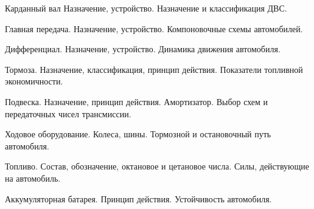 \documentclass[
	14pt,
	a4paper,
	]
	{scrartcl}
\begin{document}
\vfill
\z Карданный вал Назначение, устройство.
 \vfill
\z Назначение и классификация ДВС.
 \vfill

\vfill

\newpage


\shapk
{}
\setcounter{zad}{0}

\vfill
\z Главная передача. Назначение, устройство.
 \vfill
\z Компоновочные схемы автомобилей.
 \vfill

\vfill

\newpage


\shapk
{}
\setcounter{zad}{0}

\vfill
\z Дифференциал. Назначение, устройство.
 \vfill
\z Динамика движения автомобиля.
 \vfill

\vfill

\newpage


\shapk
{}
\setcounter{zad}{0}

\vfill
\z Тормоза. Назначение, классификация, принцип действия.
 \vfill
\z Показатели топливной экономичности.
 \vfill

\vfill

\newpage


\shapk
{}
\setcounter{zad}{0}

\vfill
\z Подвеска. Назначение, принцип действия. Амортизатор.
 \vfill
\z Выбор схем  и передаточных чисел трансмиссии.
 \vfill

\vfill

\newpage


\shapk
{}
\setcounter{zad}{0}

\vfill
\z Ходовое оборудование. Колеса, шины.
 \vfill
\z Тормозной и остановочный путь автомобиля.
 \vfill

\vfill

\newpage


\shapk
{}
\setcounter{zad}{0}

\vfill
\z Топливо. Состав, обозначение, октановое и цетановое числа.
 \vfill
\z Силы, действующие на автомобиль.
 \vfill

\vfill

\newpage


\shapk
{}
\setcounter{zad}{0}

\vfill
\z Аккумуляторная батарея. Принцип действия.
 \vfill
\z Устойчивость автомобиля.
 \vfill

\vfill
\end{document}
